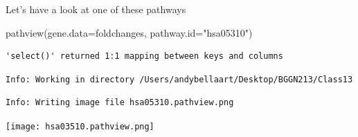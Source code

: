 \documentclass[
  letterpaper,
  DIV=11,
  numbers=noendperiod]{scrartcl}
\newenvironment{Shaded}{\begin{snugshade}}{\end{snugshade}}
\newcommand{\AttributeTok}[1]{\textcolor[rgb]{0.40,0.45,0.13}{#1}}
\newcommand{\FunctionTok}[1]{\textcolor[rgb]{0.28,0.35,0.67}{#1}}
\newcommand{\NormalTok}[1]{\textcolor[rgb]{0.00,0.23,0.31}{#1}}
\newcommand{\StringTok}[1]{\textcolor[rgb]{0.13,0.47,0.30}{#1}}
\begin{document}
Let's have a look at one of these pathways

\begin{Shaded}
\begin{Highlighting}[]
\FunctionTok{pathview}\NormalTok{(}\AttributeTok{gene.data=}\NormalTok{foldchanges, }\AttributeTok{pathway.id=}\StringTok{"hsa05310"}\NormalTok{)}
\end{Highlighting}
\end{Shaded}

\begin{verbatim}
'select()' returned 1:1 mapping between keys and columns
\end{verbatim}

\begin{verbatim}
Info: Working in directory /Users/andybellaart/Desktop/BGGN213/Class13
\end{verbatim}

\begin{verbatim}
Info: Writing image file hsa05310.pathview.png
\end{verbatim}

\texttt{[image: hsa03510.pathview.png]}
\end{document}
